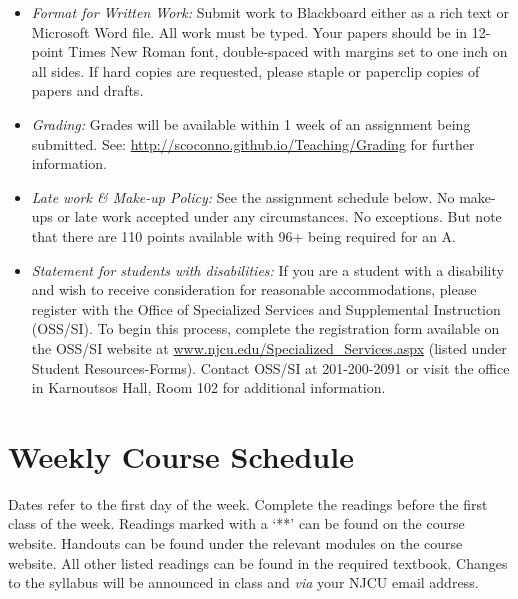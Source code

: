 \documentclass[article,oneside]{memoir}
\begin{document}
\begin{itemize}
\item \textit{Format for Written Work:} Submit work to Blackboard either as a rich text or Microsoft Word file. All work must be typed. Your papers should be in 12-point Times New Roman font, double-spaced with margins set to one inch on all sides. If hard copies are requested, please staple or paperclip copies of papers and drafts.



\item \textit{Grading:} Grades will be available within 1 week of an assignment being submitted. See: \href{http://scoconno.github.io/Teaching/Grading}{http://scoconno.github.io/Teaching/Grading} for further information.


\item \textit{Late work \& Make-up Policy:} See the assignment schedule below. No make-ups or late work accepted under any circumstances. No exceptions. But note that there are 110 points available with 96+ being required for an A.


\item \textit{Statement for students with disabilities:} If you are a student with a disability and wish to receive consideration for reasonable accommodations, please register with the Office of Specialized Services and Supplemental Instruction (OSS/SI). To begin this process, complete the registration form available on the OSS/SI website at
\href{http://www.njcu.edu/Specialized_Services.aspx}{www.njcu.edu/Specialized\_Services.aspx}
(listed under Student Resources-Forms). Contact OSS/SI at 201-200-2091
or visit the office in Karnoutsos Hall, Room 102 for additional
information.

\end{itemize}



\section{Weekly Course Schedule}
Dates refer to the first day of the week. Complete the readings before the first class of the week. Readings marked with a `**' can be found on the course website. Handouts can be found under the relevant modules on the course website. All other listed readings can be found in the required textbook. Changes to the syllabus will be announced in class and \emph{via} your NJCU email address.
\end{document}
